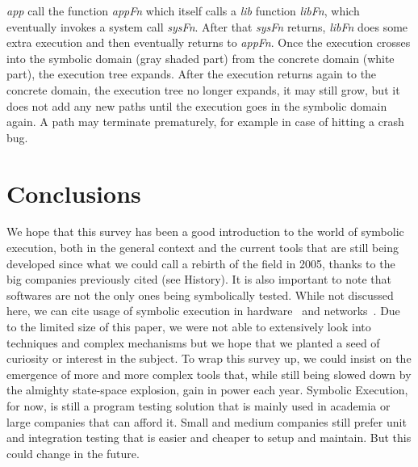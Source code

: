 \documentclass[11pt, conference]{IEEEtran}
\begin{document}
    		\emph{app} call the function \emph{appFn} which itself calls a \emph{lib} function \emph{libFn}, which eventually invokes a system call \emph{sysFn}. After that \emph{sysFn} returns, \emph{libFn} does some extra execution and then eventually returns to \emph{appFn}. Once the execution crosses into the symbolic domain (gray shaded part) from the concrete domain (white part), the execution tree expands. After the execution returns again to the concrete domain, the execution tree no longer expands, it may still grow, but it does not add any new paths until the execution goes in the symbolic domain again. A path may terminate prematurely, for example in case of hitting a crash bug.


  \hfill

  \section{Conclusions}
    We hope that this survey has been a good introduction to the world of symbolic execution, both in the general context and the current tools that are still being developed since what we could call a rebirth of the field in 2005, thanks to the big companies previously cited (see History). It is also important to note that softwares are not the only ones being symbolically tested. While not discussed here, we can cite usage of symbolic execution in hardware~\cite{Hardware} and networks~\cite{220590}. Due to the limited size of this paper, we were not able to extensively look into techniques and complex mechanisms but we hope that we planted a seed of curiosity or interest in the subject. To wrap this survey up, we could insist on the emergence of more and more complex tools that, while still being slowed down by the almighty state-space explosion, gain in power each year. Symbolic Execution, for now, is still a program testing solution that is mainly used in academia or large companies that can afford it. Small and medium companies still prefer unit and integration testing that is easier and cheaper to setup and maintain. But this could change in the future.

    \hfill %


{}

\end{document}
